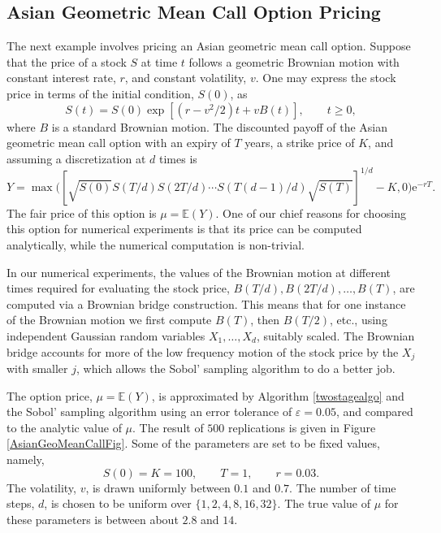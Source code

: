 \documentclass[graybox]{svmult}
\newcommand{\me}{\ensuremath{\mathrm{e}}} %
\newcommand\e{\mathbb{E}}
\begin{document}
\subsection{Asian Geometric Mean Call Option Pricing}

The next example involves pricing an Asian geometric mean call option.  Suppose that the price of a stock $S$ at time $t$ follows a geometric Brownian motion with constant interest rate, $r$, and constant volatility, $v$.  
One may express the stock price in terms of the initial condition, $S(0)$, as 
\[
S(t)=S(0) \exp[(r-v^2/2)t + v B(t)], \qquad t \ge 0,
\]
where $B$ is a standard Brownian motion.  
The discounted payoff of the Asian geometric mean call option with an expiry of $T$ years, a strike price of $K$, and assuming a discretization at $d$ times is 
\begin{equation} \label{payoff}
Y=\max\biggl([\sqrt{S(0)}S(T/d) S(2T/d)\cdots S(T(d-1)/d) \sqrt{S(T)}]^{1/d} - K,0 \biggr)\me^{-rT}.
\end{equation}
The fair price of this option is $\mu=\e(Y)$. One of our chief reasons for choosing this option for numerical experiments is that its price can be computed analytically, while the numerical computation is non-trivial.

In our numerical experiments, the values of the Brownian motion at different times required for evaluating the stock price, $B(T/d), B(2T/d), \ldots,  B(T)$, are computed via a  Brownian bridge construction.  This means that for one instance of the Brownian motion we first compute $B(T)$, then $B(T/2)$, etc., using independent Gaussian random variables $X_1, \ldots, X_d$, suitably scaled. The Brownian bridge accounts for more of the low frequency motion of the stock price by the $X_j$ with smaller $j$, which allows the Sobol' sampling algorithm to do a better job.  

The option price, $\mu=\e(Y)$, is approximated by Algorithm \ref{twostagealgo} and the Sobol' sampling algorithm using an error tolerance of $\varepsilon=0.05$, and compared to the analytic value of $\mu$.  The result of $500$ replications is given in Figure \ref{AsianGeoMeanCallFig}.  Some of the parameters are set to be fixed values, namely,
\[
S(0)=K=100, \qquad T=1, \qquad r=0.03.
\]
The volatility, $v$, is drawn uniformly between $0.1$ and $0.7$.  The number of time steps, $d$, is chosen to be uniform over $\{1, 2, 4, 8, 16, 32\}$.  The true value of $\mu$ for these parameters is between about $2.8$ and $14$.
\end{document}
